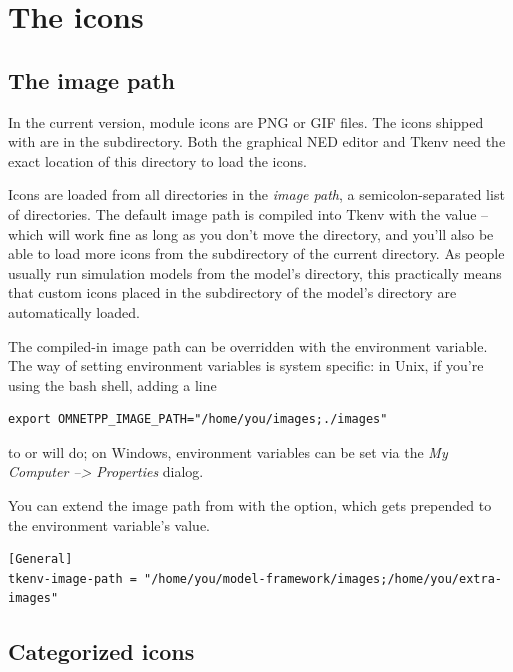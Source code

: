 \section{The icons}
\label{sec:ch-graphics:icon-library}

\subsection{The image path}

In the current {\opp} version, module icons are PNG or GIF files. The icons shipped
with {\opp} are in the  subdirectory. Both the graphical NED editor
and Tkenv need the exact location of this directory to load the icons.

Icons are loaded from all directories in the \textit{image path},
a semicolon-separated list of directories.
The default image path is compiled into Tkenv with the value
 -- which will work fine
as long as you don't move the directory, and you'll also be able to
load more icons from the  subdirectory of the current
directory. As people usually run simulation models from the model's
directory, this practically means that custom icons placed in the
 subdirectory of the model's directory are automatically
loaded.

The compiled-in image path can be overridden with the 
environment variable. The way of setting environment variables is system
specific: in Unix, if you're using the bash shell, adding a line

\begin{verbatim}
export OMNETPP_IMAGE_PATH="/home/you/images;./images"
\end{verbatim}

to  or  will do; on Windows, environment variables
can be set via the \textit{My Computer --> Properties} dialog.

You can extend the image path from  with the
 option, which gets prepended to the environment
variable's value.

\begin{verbatim}
[General]
tkenv-image-path = "/home/you/model-framework/images;/home/you/extra-images"
\end{verbatim}


\subsection{Categorized icons}

